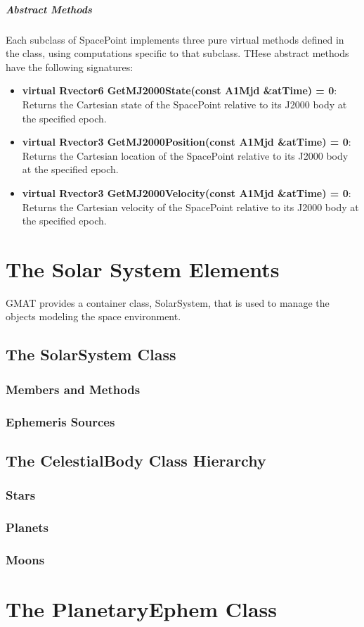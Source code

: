 \subparagraph{\textit{Abstract Methods}}

Each subclass of SpacePoint implements three pure virtual methods defined in the class, using
computations specific to that subclass.  THese abstract methods have the following signatures:

\begin{itemize}
\item \textbf{virtual Rvector6 GetMJ2000State(const A1Mjd \&atTime) = 0}: Returns the Cartesian
state of the SpacePoint relative to its J2000 body at the specified epoch.
\item \textbf{virtual Rvector3 GetMJ2000Position(const A1Mjd \&atTime) = 0}: Returns the Cartesian
location of the SpacePoint relative to its J2000 body at the specified epoch.
\item \textbf{virtual Rvector3 GetMJ2000Velocity(const A1Mjd \&atTime) = 0}: Returns the Cartesian
velocity of the SpacePoint relative to its J2000 body at the specified epoch.
\end{itemize}

\section{The Solar System Elements}

GMAT provides a container class, SolarSystem, that is used to manage the objects modeling the space
environment.

\subsection{The SolarSystem Class}

\subsubsection{Members and Methods}

\subsubsection{Ephemeris Sources}

\subsection{The CelestialBody Class Hierarchy}

\subsubsection{Stars}

\subsubsection{Planets}

\subsubsection{Moons}

\section{The PlanetaryEphem Class}

